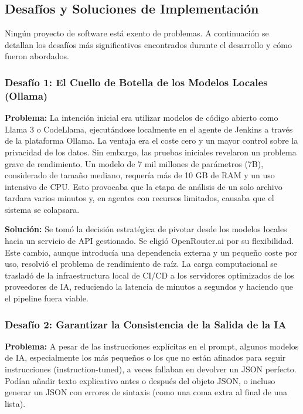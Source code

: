 \subsection{Desafíos y Soluciones de Implementación}
\label{subsec:desafios_soluciones}
Ningún proyecto de software está exento de problemas. A continuación se detallan los desafíos más significativos encontrados durante el desarrollo y cómo fueron abordados.

\subsubsection{Desafío 1: El Cuello de Botella de los Modelos Locales (Ollama)}

\textbf{Problema:} La intención inicial era utilizar modelos de código abierto como Llama 3 o CodeLlama, ejecutándose localmente en el agente de Jenkins a través de la plataforma Ollama. La ventaja era el coste cero y un mayor control sobre la privacidad de los datos. Sin embargo, las pruebas iniciales revelaron un problema grave de rendimiento. Un modelo de 7 mil millones de parámetros (7B), considerado de tamaño mediano, requería más de 10 GB de RAM y un uso intensivo de CPU. Esto provocaba que la etapa de análisis de un solo archivo tardara varios minutos y, en agentes con recursos limitados, causaba que el sistema se colapsara.

\textbf{Solución:} Se tomó la decisión estratégica de pivotar desde los modelos locales hacia un servicio de API gestionado. Se eligió OpenRouter.ai por su flexibilidad. Este cambio, aunque introducía una dependencia externa y un pequeño coste por uso, resolvió el problema de rendimiento de raíz. La carga computacional se trasladó de la infraestructura local de CI/CD a los servidores optimizados de los proveedores de IA, reduciendo la latencia de minutos a segundos y haciendo que el pipeline fuera viable.

\subsubsection{Desafío 2: Garantizar la Consistencia de la Salida de la IA}

\textbf{Problema:} A pesar de las instrucciones explícitas en el prompt, algunos modelos de IA, especialmente los más pequeños o los que no están afinados para seguir instrucciones (instruction-tuned), a veces fallaban en devolver un JSON perfecto. Podían añadir texto explicativo antes o después del objeto JSON, o incluso generar un JSON con errores de sintaxis (como una coma extra al final de una lista).

